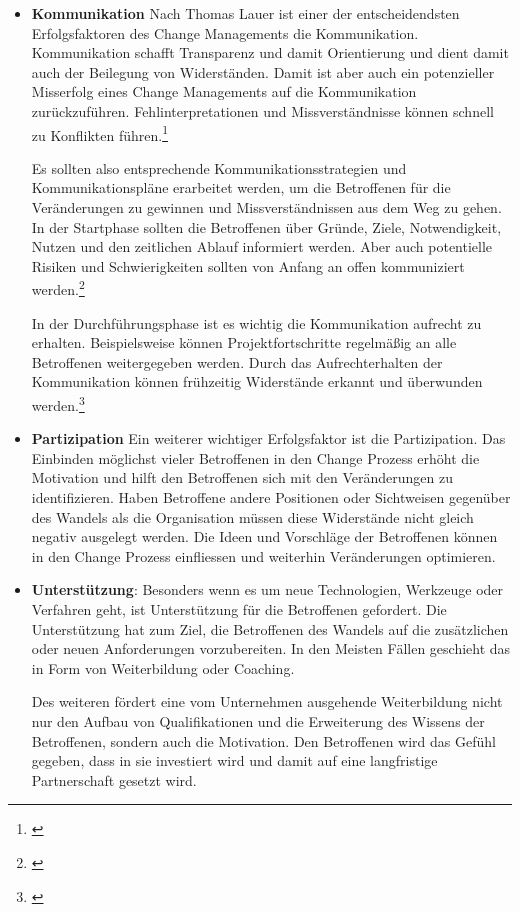 \begin{itemize}
\item \textbf{Kommunikation}
Nach Thomas Lauer ist einer der entscheidendsten Erfolgsfaktoren des Change Managements die Kommunikation. Kommunikation schafft Transparenz und damit Orientierung und dient damit auch der Beilegung von Widerständen. Damit ist aber auch ein potenzieller Misserfolg eines Change Managements auf die Kommunikation zurückzuführen. Fehlinterpretationen und Missverständnisse können schnell zu Konflikten führen.\footnote{\cite{lauer_change_2014}}

Es sollten also entsprechende Kommunikationsstrategien und Kommunikationspläne erarbeitet werden, um die Betroffenen für die Veränderungen zu gewinnen und Missverständnissen aus dem Weg zu gehen. In der Startphase sollten die Betroffenen über Gründe, Ziele, Notwendigkeit, Nutzen und den zeitlichen Ablauf informiert werden. Aber auch potentielle Risiken und Schwierigkeiten sollten von Anfang an offen kommuniziert werden.\footnote{\cite{fisch_veraenderungen_2008}}

In der Durchführungsphase ist es wichtig die Kommunikation aufrecht zu erhalten. Beispielsweise können Projektfortschritte regelmäßig an alle Betroffenen weitergegeben werden. Durch das Aufrechterhalten der Kommunikation können frühzeitig Widerstände erkannt und überwunden werden.\footnote{\cite{lauer_change_2014}} 

\item \textbf{Partizipation}
Ein weiterer wichtiger Erfolgsfaktor ist die Partizipation. Das Einbinden möglichst vieler Betroffenen in den Change Prozess erhöht die Motivation und hilft den Betroffenen sich mit den Veränderungen zu identifizieren. Haben Betroffene andere Positionen oder Sichtweisen gegenüber des Wandels als die Organisation müssen diese Widerstände nicht gleich negativ ausgelegt werden. Die Ideen und Vorschläge der Betroffenen können in den Change Prozess einfliessen und weiterhin Veränderungen optimieren.

\item \textbf{Unterstützung}:
Besonders wenn es um neue Technologien, Werkzeuge oder Verfahren geht, ist Unterstützung für die Betroffenen gefordert. Die Unterstützung hat zum Ziel, die Betroffenen des Wandels auf die zusätzlichen oder neuen Anforderungen vorzubereiten. In den Meisten Fällen geschieht das in Form von Weiterbildung oder Coaching.

Des weiteren fördert eine vom Unternehmen ausgehende Weiterbildung nicht nur den Aufbau von Qualifikationen und die Erweiterung des Wissens der Betroffenen, sondern auch die Motivation. Den Betroffenen wird das Gefühl gegeben, dass in sie investiert wird und damit auf eine langfristige Partnerschaft gesetzt wird.
\end{itemize}

